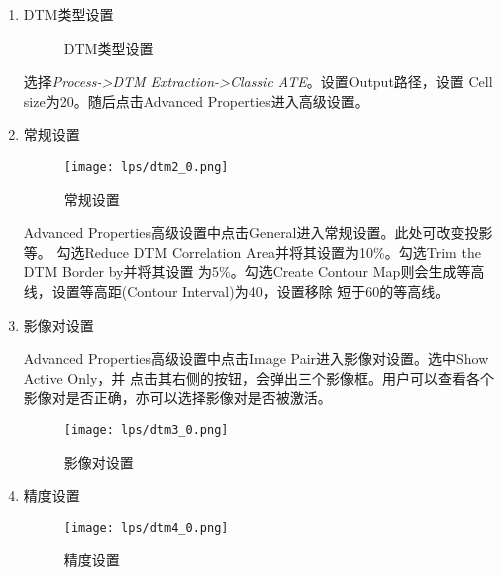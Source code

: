     \begin{enumerate}
        \item DTM类型设置
        \begin{figure}[H]
            \centering
            \caption{DTM类型设置}
        \end{figure}

        \hspace{20pt}选择\textit{Process->DTM Extraction->Classic ATE}。设置Output路径，设置
        Cell size为20。随后点击Advanced Properties进入高级设置。

        \item 常规设置
        
        \begin{figure}[H] 
            \centering 
            \texttt{[image: lps/dtm2\_0.png]}
            \caption{常规设置}
        \end{figure}

        \hspace{20pt}Advanced Properties高级设置中点击General进入常规设置。此处可改变投影等。
        勾选Reduce DTM Correlation Area并将其设置为10\%。勾选Trim the DTM Border by并将其设置
        为5\%。勾选Create Contour Map则会生成等高线，设置等高距(Contour Interval)为40，设置移除
        短于60的等高线。

        \item 影像对设置
        
        \hspace{20pt}Advanced Properties高级设置中点击Image Pair进入影像对设置。选中Show Active Only，并
        点击其右侧的按钮，会弹出三个影像框。用户可以查看各个影像对是否正确，亦可以选择影像对是否被激活。

        \begin{figure}[H] 
            \centering 
            \texttt{[image: lps/dtm3\_0.png]}
            \caption{影像对设置}
        \end{figure}

        \item 精度设置
        
        \begin{figure}[H] 
            \centering 
            \texttt{[image: lps/dtm4\_0.png]}
            \caption{精度设置}
        \end{figure}


\end{enumerate}
